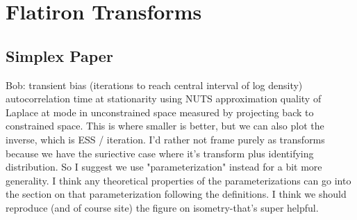 \section{Flatiron Transforms}
\label{sec:transforms}
\subsection{Simplex Paper}



Bob: transient bias (iterations to reach central interval of log density)
autocorrelation time at stationarity using NUTS
approximation quality of Laplace at mode in unconstrained space measured by projecting back to constrained space. This is where smaller is better, but we can also plot the inverse, which is ESS / iteration. I'd rather not frame purely as transforms because we have the suriective case where it's transform plus identifying distribution. So I suggest we use "parameterization" instead for a bit more generality. I think any theoretical properties of the parameterizations can go into the section on that parameterization following the definitions. I think we should reproduce (and of course site) the figure on isometry-that's super helpful.